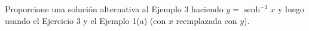 \item Proporcione una solución alternativa al Ejemplo 3 haciendo $y = \operatorname{senh}^{-1} x$ y luego usando el Ejercicio 3 y el Ejemplo 1(a) (con $x$ reemplazada con $y$).
